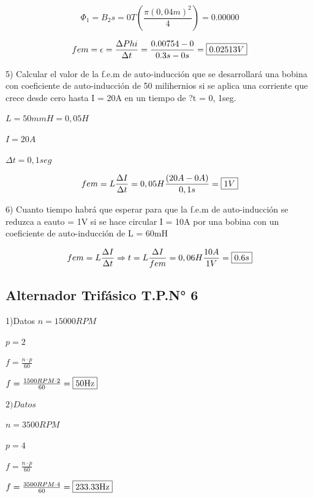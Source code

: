 \begin{equation}
\Phi_1=B_2s=0T (\frac{\pi (0,04m)^2}{4})=0.00000
\end{equation}

\begin{equation}
fem=\epsilon= \frac{\Delta\\Phi}{\Delta t}=\frac{0.00754-0}{0.3s-0s} =\fbox{$0.02513V$}
\end{equation}

5) Calcular el valor de la f.e.m de auto-inducción que se desarrollará una bobina con coeficiente
de auto-inducción de 50 milihernios si se aplica una corriente que crece desde cero hasta
I = 20A en un tiempo de ?t = 0, 1seg.


$ L=50mmH=0,05H$


$I=20A$

$\Delta t = 0,1seg$

\begin{equation}
fem=L\frac{\Delta I}{\Delta t }=0,05H\frac{(20A-0A)}{0,1s}=\fbox{$1V$}
\end{equation}

6) Cuanto tiempo habrá que esperar para que la f.e.m de auto-inducción se reduzca a eauto = 1V
si se hace circular I = 10A por una bobina con un coeficiente de auto-inducción de L = 60mH

\begin{equation}
fem=L\frac{\Delta I}{\Delta t }\Rightarrow t= L \frac{\Delta I}{fem}= 0,06H \frac{10A}{1V}=\fbox{$0.6s$}
\end{equation}

\subsection{Alternador Trifásico T.P.N° 6}

\vspace{1cm}
1)Datos
$n=15000RPM$

$p=2$

$f=\frac{n\cdot p}{60}$

$f=\frac{1500RPM\cdot 2}{60}=\fbox{50Hz}$

\vspace{1cm}

$2)Datos$

$n=3500RPM$

$p=4$

$f=\frac{n\cdot p}{60} $

$f=\frac{3500RPM\cdot 4}{60}=\fbox{233.33Hz}$

\vspace{1cm}

